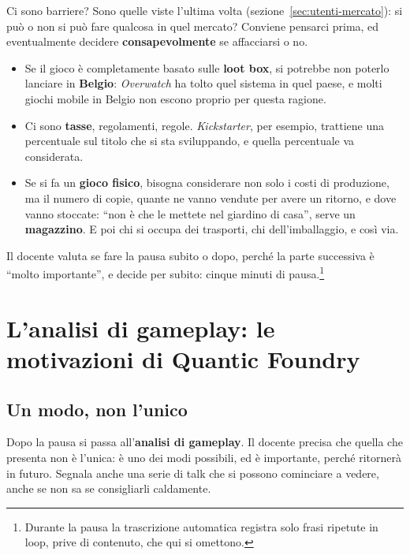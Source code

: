 Ci sono barriere? Sono quelle viste l'ultima volta
(sezione~\ref{sec:utenti-mercato}): si può o non si può fare qualcosa in quel
mercato? Conviene pensarci prima, ed eventualmente decidere
\textbf{consapevolmente} se affacciarsi o no.
\begin{itemize}
  \item Se il gioco è completamente basato sulle \textbf{loot box}, si
        potrebbe non poterlo lanciare in \textbf{Belgio}: \emph{Overwatch} ha
        tolto quel sistema in quel paese, e molti giochi mobile in Belgio non
        escono proprio per questa ragione.
  \item Ci sono \textbf{tasse}, regolamenti, regole. \emph{Kickstarter}, per
        esempio, trattiene una percentuale sul titolo che si sta sviluppando,
        e quella percentuale va considerata.
  \item Se si fa un \textbf{gioco fisico}, bisogna considerare non solo i
        costi di produzione, ma il numero di copie, quante ne vanno vendute
        per avere un ritorno, e dove vanno stoccate: ``non è che le mettete
        nel giardino di casa'', serve un \textbf{magazzino}. E poi chi si
        occupa dei trasporti, chi dell'imballaggio, e così via.
\end{itemize}

Il docente valuta se fare la pausa subito o dopo, perché la parte successiva
è ``molto importante'', e decide per subito: cinque minuti di
pausa.\footnote{Durante la pausa la trascrizione automatica registra solo
frasi ripetute in loop, prive di contenuto, che qui si omettono.}

\section{L'analisi di gameplay: le motivazioni di Quantic Foundry}
\label{sec:quantic-foundry}



\subsection{Un modo, non l'unico}

Dopo la pausa si passa all'\textbf{analisi di gameplay}. Il docente precisa
che quella che presenta non è l'unica: è uno dei modi possibili, ed è
importante, perché ritornerà in futuro. Segnala anche una serie di talk che
si possono cominciare a vedere, anche se non sa se consigliarli caldamente.

